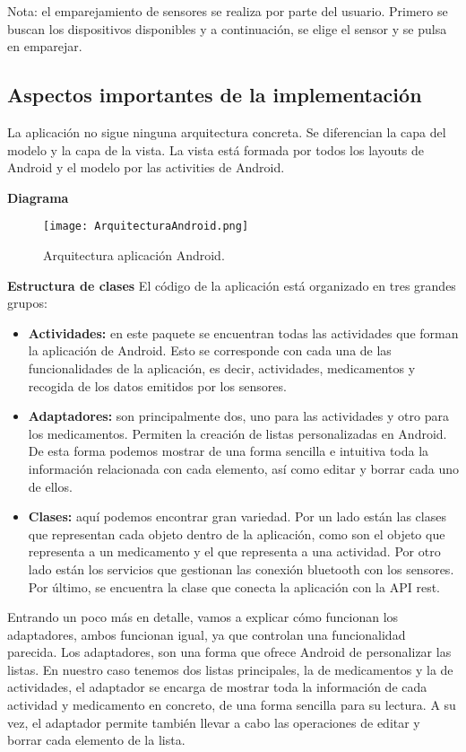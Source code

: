 \documentclass[11pt,spanish]{article}
\begin{document}
Nota: el emparejamiento de sensores se realiza por parte del usuario. Primero se buscan los dispositivos disponibles y a continuación, se elige el sensor y se pulsa en emparejar.
\newpage

\subsection{Aspectos importantes de la implementación}
La aplicación no sigue ninguna arquitectura concreta. Se diferencian la capa del modelo y la capa de la vista. La vista está formada por todos los layouts de Android y el modelo por las activities de Android.
\newline

{\bf Diagrama}
\begin{figure}[h!]
  \centering
  \texttt{[image: ArquitecturaAndroid.png]}
  \caption{Arquitectura aplicación Android.}
\end{figure}

{\bf Estructura de clases}
\newline
\newline
El código de la aplicación está organizado en tres grandes grupos:

\begin{itemize}
	\item {\bf Actividades: } en este paquete se encuentran todas las actividades que forman la aplicación de Android. Esto se corresponde con cada una de las funcionalidades de la aplicación, es decir, actividades, medicamentos y recogida de los datos emitidos por los sensores.
    \item {\bf Adaptadores: } son principalmente dos, uno para las actividades y otro para los medicamentos. Permiten la creación de listas personalizadas en Android. De esta forma podemos mostrar de una forma sencilla e intuitiva toda la información relacionada con cada elemento, así como editar y borrar cada uno de ellos.
    \item {\bf Clases: } aquí podemos encontrar gran variedad. Por un lado están las clases que representan cada objeto dentro de la aplicación, como son el objeto que representa a un medicamento y el que representa a una actividad. Por otro lado están los servicios que gestionan las conexión bluetooth con los sensores. Por último, se encuentra la clase que conecta la aplicación con la API rest.
\newline
\end{itemize}

Entrando un poco más en detalle, vamos a explicar cómo funcionan los adaptadores, ambos funcionan igual, ya que controlan una funcionalidad parecida. Los adaptadores, son una forma que ofrece Android de personalizar las listas. En nuestro caso tenemos dos listas principales, la de medicamentos y la de actividades, el adaptador se encarga de mostrar toda la información de cada actividad y medicamento en concreto, de una forma sencilla para su lectura. A su vez, el adaptador permite también llevar a cabo las operaciones de editar y borrar cada elemento de la lista.
\newline
\end{document}
